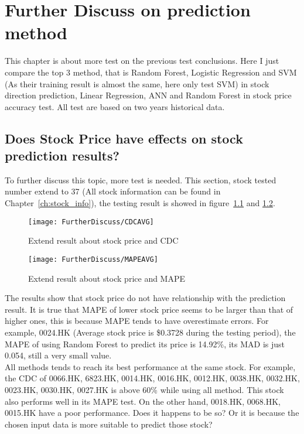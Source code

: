 \chapter{Further Discuss on prediction method}
\label{ch:futuerDiscuss}


This chapter is about more test on the previous test conclusions. Here I just compare the top 3 method, that is Random Forest, Logistic Regression and SVM (As their training result is almost the same, here only test SVM) in stock direction prediction, Linear Regression, ANN and Random Forest in stock price accuracy test. All test are based on two years historical data. 

\section{Does Stock Price have effects on stock prediction results?}
\label{sec:priceInfluence}
To further discuss this topic, more test is needed. This section, stock tested number extend to 37 (All stock information can be found in Chapter~\ref{ch:stock_info}), the testing result is showed in figure~\ref{fg:furtherCDC} and \ref{fg:furtherMAPE}. 


\begin{figure}[h]
	\centering
	\texttt{[image: FurtherDiscuss/CDCAVG]}
	\caption{Extend result about stock price and CDC}
	\label{fg:furtherCDC}
\end{figure}


\begin{figure}[h]
	\centering
	\texttt{[image: FurtherDiscuss/MAPEAVG]}
	\caption{Extend result about stock price and MAPE}
	\label{fg:furtherMAPE}
\end{figure}
\clearpage

The results show that stock price do not have relationship with the prediction result. It is true that MAPE of lower stock price seems to be larger than that of higher ones, this is because MAPE tends to have overestimate errors. For example, 0024.HK (Average stock price is \$0.3728 during the testing period), the MAPE of using Random Forest to predict its price is 14.92\%, its MAD is just 0.054, still a very small value.\\


All methods tends to reach its best performance at the same stock. For example, the CDC of 0066.HK, 6823.HK, 0014.HK, 0016.HK, 0012.HK, 0038.HK, 0032.HK, 0023.HK, 0030.HK, 0027.HK is above 60\% while using all method. This stock also performs well in its MAPE test. On the other hand, 0018.HK, 0068.HK, 0015.HK have a poor performance. Does it happens to be so? Or it is because the chosen input data is more suitable to predict those stock?


